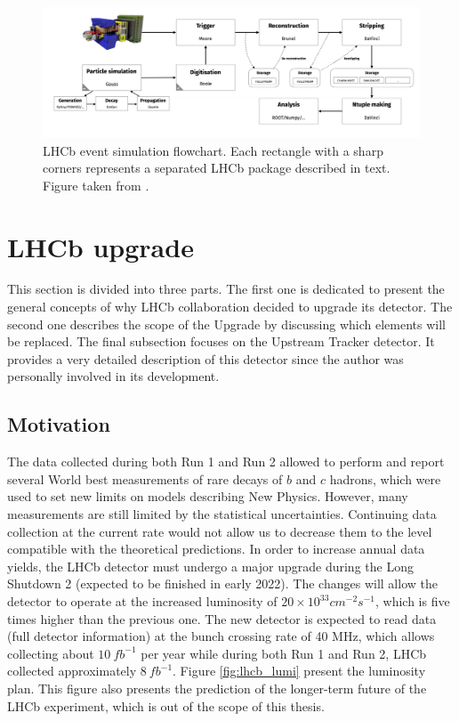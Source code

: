 \begin{figure}[!h]
\centering
\includegraphics[angle =90]{figures/LHCb_simulation.PNG}
\caption{LHCb event simulation flowchart. Each rectangle with a sharp corners represents a separated LHCb package described in text. Figure taken from  \cite{lhcb_computing}.
\label{fig:lhcb_sim}}
\end{figure}



\section{LHCb upgrade}
This section is divided into three parts. The first one is dedicated to present the general concepts of why LHCb collaboration decided to upgrade its detector. The second one describes the scope of the Upgrade by discussing which elements will be replaced. The final subsection focuses on the Upstream Tracker detector. It provides a very detailed description of this detector since the author was personally involved in its development.  

\subsection{Motivation}

The data collected during both Run 1 and Run 2 allowed to perform and report several World best measurements of rare decays of $b$ and $c$ hadrons, which were used to set new limits on models describing New Physics. However, many measurements are still limited by the statistical uncertainties. Continuing data collection at the current rate would not allow us to decrease them to the level compatible with the theoretical predictions. In order to increase annual data yields, the LHCb detector must undergo a major upgrade during the Long Shutdown 2 (expected to be finished in early 2022).  The changes will allow the detector to operate at the increased luminosity of $20 \times 10^{33} cm^{-2}s^{-1}$, which is five times higher than the previous one. The new detector is expected to read data (full detector information) at the bunch crossing rate of 40 MHz, which allows collecting about $10~ fb^{-1}$ per year while during both Run 1 and Run 2, LHCb collected approximately $8~ fb^{-1}$. Figure \ref{fig:lhcb_lumi} present the luminosity plan. This figure also presents the prediction of the longer-term future of the LHCb experiment, which is out of the scope of this thesis.  

